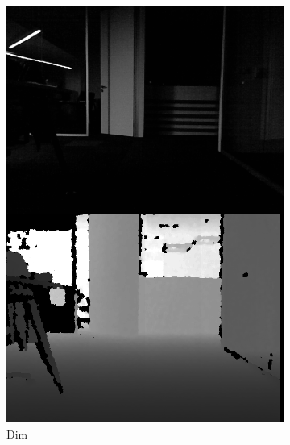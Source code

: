 \documentclass[]{spie}  %
\begin{document}
\begin{figure}[!htb]
\begin{subfigure}[b]{0.27\textwidth}
        \includegraphics[trim = 0mm 0mm 0mm 0mm, clip, width=\textwidth]{figures/dataset_dim.png}    
        \caption{Dim}
        \label{subfig:dataset_dim}
        \end{subfigure}
         ~ 
        \begin{subfigure}[b]{0.27\textwidth}
        \centering

\end{subfigure}
\end{figure}
\end{document}
